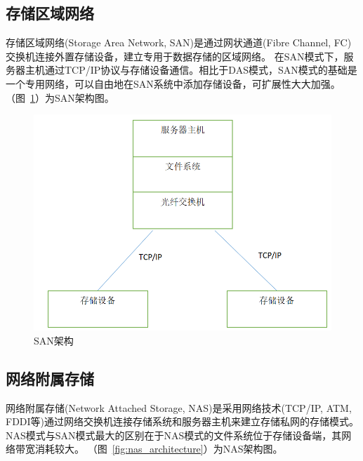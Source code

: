 \subsection{存储区域网络}

存储区域网络(Storage Area Network, SAN)是通过网状通道(Fibre Channel, FC)交换机连接外置存储设备，建立专用于数据存储的区域网络。
在SAN模式下，服务器主机通过TCP/IP协议与存储设备通信。相比于DAS模式，SAN模式的基础是一个专用网络，可以自由地在SAN系统中添加存储设备，可扩展性大大加强。
（图~\ref{fig:san_architecture}）为SAN架构图。

\begin{figure}
\centering
\includegraphics[scale=0.45]{Figures/storage/san_architecture.jpg}
\decoRule
\caption{SAN架构}
\label{fig:san_architecture}
\end{figure}

\subsection{网络附属存储}

网络附属存储(Network Attached Storage, NAS)是采用网络技术(TCP/IP, ATM, FDDI等)通过网络交换机连接存储系统和服务器主机来建立存储私网的存储模式。
NAS模式与SAN模式最大的区别在于NAS模式的文件系统位于存储设备端，其网络带宽消耗较大。
（图~\ref{fig:nas_architecture}）为NAS架构图。

